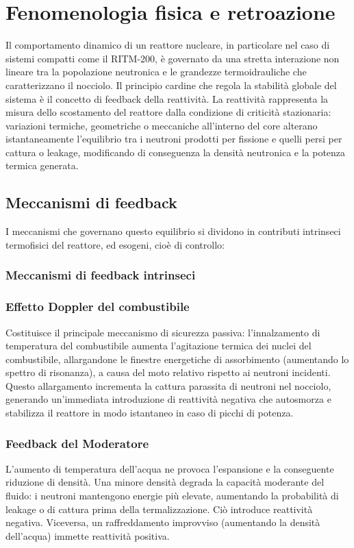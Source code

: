 \documentclass[12pt]{report}
\begin{document}
\section{ Fenomenologia fisica e retroazione}

 Il comportamento dinamico di un reattore nucleare, in particolare nel caso di sistemi compatti come il RITM-200, è governato da una stretta interazione non lineare tra la popolazione neutronica e le grandezze termoidrauliche che caratterizzano il nocciolo. Il principio cardine che regola la stabilità globale del sistema è il concetto di feedback della reattività. La reattività rappresenta la misura dello scostamento del reattore dalla condizione di criticità stazionaria: variazioni termiche, geometriche o meccaniche all'interno del core alterano istantaneamente l'equilibrio tra i neutroni prodotti per fissione e quelli persi per cattura o leakage, modificando di conseguenza la densità neutronica e la potenza termica generata.

\subsection{Meccanismi di feedback}

I meccanismi che governano questo equilibrio si dividono in contributi intrinseci termofisici del reattore, ed esogeni, cioè di controllo:

\subsubsection{\textbf{Meccanismi di feedback intrinseci}}

\subsubsection{Effetto Doppler del combustibile} Costituisce il principale meccanismo di sicurezza passiva: l’innalzamento di temperatura del combustibile aumenta l’agitazione termica dei nuclei del combustibile, allargandone le finestre energetiche di assorbimento (aumentando lo spettro di risonanza), a causa del moto relativo rispetto ai neutroni incidenti. Questo allargamento incrementa la cattura parassita di neutroni nel nocciolo, generando un’immediata introduzione di reattività negativa che autosmorza e stabilizza il reattore in modo istantaneo in caso di picchi di potenza.


\subsubsection{Feedback del Moderatore} L'aumento di temperatura dell'acqua ne provoca l'espansione e la conseguente riduzione di densità. Una minore densità degrada la capacità moderante del fluido: i neutroni mantengono energie più elevate, aumentando la probabilità di leakage o di cattura prima della termalizzazione. Ciò introduce reattività negativa. Viceversa, un raffreddamento improvviso (aumentando la densità dell'acqua) immette reattività positiva.
\end{document}
